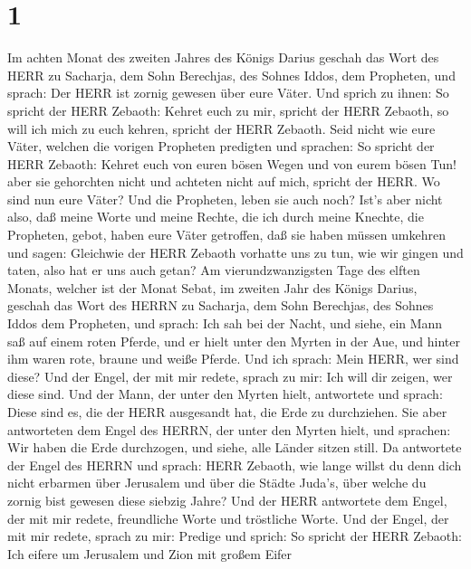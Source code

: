 \hypertarget{section}{%
\section{1}\label{section}}

 Im achten Monat des zweiten Jahres des Königs Darius
geschah das Wort des HERR zu Sacharja, dem Sohn Berechjas, des Sohnes
Iddos, dem Propheten, und sprach:  Der HERR ist zornig
gewesen über eure Väter.  Und sprich zu ihnen: So spricht
der HERR Zebaoth: Kehret euch zu mir, spricht der HERR Zebaoth, so will
ich mich zu euch kehren, spricht der HERR Zebaoth.  Seid
nicht wie eure Väter, welchen die vorigen Propheten predigten und
sprachen: So spricht der HERR Zebaoth: Kehret euch von euren bösen Wegen
und von eurem bösen Tun! aber sie gehorchten nicht und achteten nicht
auf mich, spricht der HERR.  Wo sind nun eure Väter? Und die
Propheten, leben sie auch noch?  Ist's aber nicht also, daß
meine Worte und meine Rechte, die ich durch meine Knechte, die
Propheten, gebot, haben eure Väter getroffen, daß sie haben müssen
umkehren und sagen: Gleichwie der HERR Zebaoth vorhatte uns zu tun, wie
wir gingen und taten, also hat er uns auch getan?  Am
vierundzwanzigsten Tage des elften Monats, welcher ist der Monat Sebat,
im zweiten Jahr des Königs Darius, geschah das Wort des HERRN zu
Sacharja, dem Sohn Berechjas, des Sohnes Iddos dem Propheten, und
sprach:  Ich sah bei der Nacht, und siehe, ein Mann saß auf
einem roten Pferde, und er hielt unter den Myrten in der Aue, und hinter
ihm waren rote, braune und weiße Pferde.  Und ich sprach:
Mein HERR, wer sind diese? Und der Engel, der mit mir redete, sprach zu
mir: Ich will dir zeigen, wer diese sind.  Und der Mann,
der unter den Myrten hielt, antwortete und sprach: Diese sind es, die
der HERR ausgesandt hat, die Erde zu durchziehen.  Sie aber
antworteten dem Engel des HERRN, der unter den Myrten hielt, und
sprachen: Wir haben die Erde durchzogen, und siehe, alle Länder sitzen
still.  Da antwortete der Engel des HERRN und sprach: HERR
Zebaoth, wie lange willst du denn dich nicht erbarmen über Jerusalem und
über die Städte Juda's, über welche du zornig bist gewesen diese siebzig
Jahre?  Und der HERR antwortete dem Engel, der mit mir
redete, freundliche Worte und tröstliche Worte.  Und der
Engel, der mit mir redete, sprach zu mir: Predige und sprich: So spricht
der HERR Zebaoth: Ich eifere um Jerusalem und Zion mit großem Eifer
